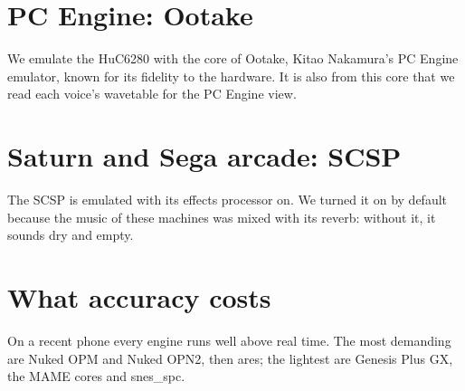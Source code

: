 \section{PC Engine: Ootake}
We emulate the HuC6280 with the core of Ootake, Kitao Nakamura's PC Engine emulator, known for its fidelity to the
hardware. It is also from this core that we read each voice's wavetable for the PC Engine view.

\section{Saturn and Sega arcade: SCSP}
The SCSP is emulated with its effects processor on. We turned it on by default because the music of these machines
was mixed with its reverb: without it, it sounds dry and empty.

\section{What accuracy costs}
On a recent phone every engine runs well above real time. The most demanding are Nuked OPM and Nuked OPN2, then ares;
the lightest are Genesis Plus GX, the MAME cores and snes\_spc.
